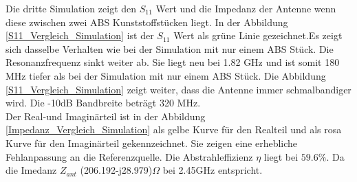 Die dritte Simulation zeigt den $S_{11}$ Wert und die Impedanz der Antenne wenn diese zwischen zwei ABS Kunststoffstücken liegt. In der Abbildung \ref{S11_Vergleich_Simulation} ist der $S_{11}$ Wert als grüne Linie gezeichnet.Es zeigt sich dasselbe Verhalten wie bei der Simulation mit nur einem ABS Stück. Die Resonanzfrequenz sinkt weiter ab. Sie liegt neu bei 1.82 GHz und ist somit 180 MHz tiefer als bei der Simulation mit nur einem ABS Stück. Die Abbildung  \ref{S11_Vergleich_Simulation} zeigt weiter, dass die Antenne immer schmalbandiger wird. Die -10dB Bandbreite beträgt 320 MHz.\\
Der Real-und Imaginärteil ist in der Abbildung \ref{Impedanz_Vergleich_Simulation} als gelbe Kurve für den Realteil und als rosa Kurve für den Imaginärteil gekennzeichnet. Sie zeigen eine erhebliche Fehlanpassung an die Referenzquelle. Die Abstrahleffizienz $\eta$ liegt  bei $59.6 \%$. Da die Imedanz $Z_{ant}$ (206.192-j28.979)$\Omega$ bei 2.45GHz entspricht.\\





